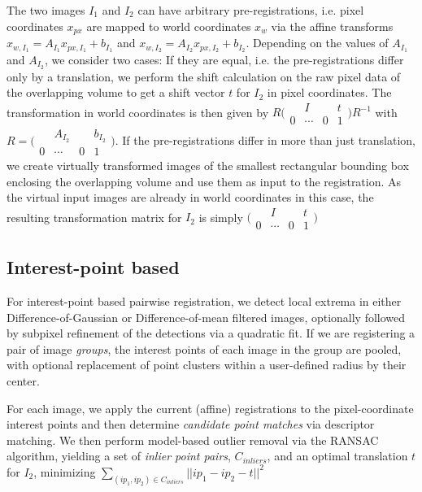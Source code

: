 The two images $I_1$ and $I_2$ can have arbitrary pre-registrations, i.e. pixel coordinates $x_{px}$ are mapped to world coordinates $x_w$ via the affine transforms $x_{w,I_1} = A _{I_1}x_{px,I_1} + b_{I_1}$ and $x_{w,I_2} = A _{I_2}x_{px,I_2} + b_{I_2}$. Depending on the values of $ A _{I_1}$ and $ A _{I_2}$, we consider two cases: If they are equal, i.e. the pre-registrations differ only by a translation, we perform the shift calculation on the raw pixel data of the overlapping volume to get a shift vector $t$ for $I_2$ in pixel coordinates. The transformation in world coordinates is then given by $R \bigl(\begin{smallmatrix}  & I & & t \\  0 & \cdots & 0 & 1 \end{smallmatrix}\bigr) R^{-1} $ with $R = \bigl(\begin{smallmatrix}  & A_{I_2} & & b_{I_2} \\  0 & \cdots & 0 & 1 \end{smallmatrix}\bigr)$. If the pre-registrations differ in more than just translation, we create virtually transformed images of the smallest rectangular bounding box enclosing the overlapping volume and use them as input to the registration. As the virtual input images are already in world coordinates in this case, the resulting transformation matrix for $I_2$ is simply $\bigl(\begin{smallmatrix}  & I & & t \\  0 & \cdots & 0 & 1 \end{smallmatrix}\bigr)$

\subsection*{Interest-point based}
\label{sssec:ip-registration}

For interest-point based pairwise registration, we detect local extrema in either Difference-of-Gaussian or Difference-of-mean filtered images, optionally followed by subpixel refinement of the detections via a quadratic fit. If we are registering a pair of image \emph{groups}, the interest points of each image in the group are pooled, with optional replacement of point clusters within a user-defined radius by their center.

For each image, we apply the current (affine) registrations to the pixel-coordinate interest points and then determine \emph{candidate point matches} via descriptor matching. We then perform model-based outlier removal via the RANSAC algorithm, yielding a set of \emph{inlier point pairs}, $C_{inliers}$, and an optimal translation $t$ for $I_2$, minimizing $\sum_{(ip_1, ip_2) \in C_{inliers} }{|| ip_1 - ip_2 - t||^2}$

